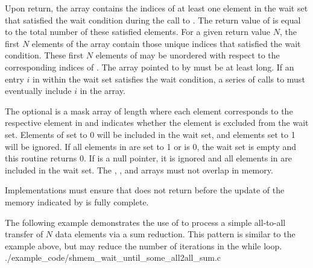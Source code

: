\begin{apidefinition}
{    Upon return, the  array contains the indices of at least one
    element in the wait set that satisfied the wait condition during the call
    to .  The return value of
     is equal to the total number of these
    satisfied elements.  For a given return value $N$, the first $N$
    elements of the  array contain those unique indices that
    satisfied the wait condition.
    These first $N$ elements of  may be unordered with respect to
    the corresponding indices of .
    The array pointed to by  must
    be at least  long.  If an entry $i$ in  within the
    wait set satisfies the wait condition, a series of calls to
     must eventually include $i$ in the
     array.

    The optional  is a mask array of length  where each
    element corresponds to the respective element in  and indicates
    whether the element is excluded from the wait set.  Elements of
     set to 0 will be included in the wait set, and elements set to
    1 will be ignored.  If all elements in  are set to 1 or
     is 0, the wait set is empty and this routine returns 0.
    If  is a null pointer, it is ignored
    and all elements in  are included in the wait set.  The
    , , and  arrays must not overlap in
    memory.

    Implementations must ensure that  does not
    return before the update of the memory indicated by  is fully
    complete.
}





\begin{apiexamples}
  \apicexample
      {The following \Cstd[11] example demonstrates the use of
       to process a simple all-to-all transfer
      of $N$ data elements via a sum reduction.  This pattern is similar to the
       example above, but may reduce the number of
      iterations in the while loop.}
      {./example_code/shmem_wait_until_some_all2all_sum.c}
      {}

\end{apiexamples}

\end{apidefinition}
